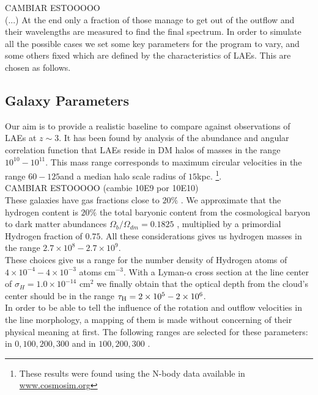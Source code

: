 \documentclass{latex/emulateapj}
\begin{document}
CAMBIAR ESTOOOOO\\ 

(...) At the end only a fraction of those manage to get out of the outflow and their wavelengths are measured to find the final spectrum. In order to simulate all the possible cases we set some key parameters for the program to vary, and some others fixed which are defined by the characteristics of LAEs. This are chosen as follows.\\

\subsection{Galaxy Parameters}

Our aim is to provide a realistic baseline to compare against observations of LAEs at $z\sim 3$. It has been found by analysis of the abundance and angular correlation function that LAEs reside in DM halos of masses in the range $10^{10}-10^{11}$\Msun \cite{WalkerSoler2012}. This mass range corresponds to maximum circular velocities in the range $60-125$\kms and a median halo scale radius of $15$kpc. \footnote{These results were found using the  N-body data available in \url{www.cosmosim.org}}. \\

CAMBIAR ESTOOOOO (cambie 10E9 por 10E10)\\

These galaxies have gas fractions close to $20\%$ \citep{Narayanan2012}. We approximate that the hydrogen content is $20\%$ the total baryonic content from the cosmological baryon to dark matter  abundances $\Omega_b/\Omega_{dm}=0.1825$ \citep{Planck2015}, multiplied by a primordial Hydrogen fraction of $0.75$. All these considerations gives us hydrogen masses in the range $2.7\times 10^{8}-2.7\times 10^{9}$\Msun.\\

These choices give us a range for the number density of Hydrogen atoms of $4\times10^{-4}-4\times 10^{-3}$ atoms cm$^{-3}$. With a Lyman-$\alpha$ cross section at the line center of $\sigma_{H}=1.0\times 10^{-14}$ cm$^{2}$ we finally obtain that the optical depth from the cloud's center  should be in the range $\tau_{\rm H}=2 \times 10^{5} - 2 \times 10^{6}$.  \\

In order to be able to tell the influence of the rotation and outflow velocities in the \lya line morphology, a mapping of them is made without concerning of their physical meaning at first. The following ranges are selected for these parameters: \vrot in $0,100,200,300$ \kms and \vout in $100,200,300$ \kms.\\
\end{document}
